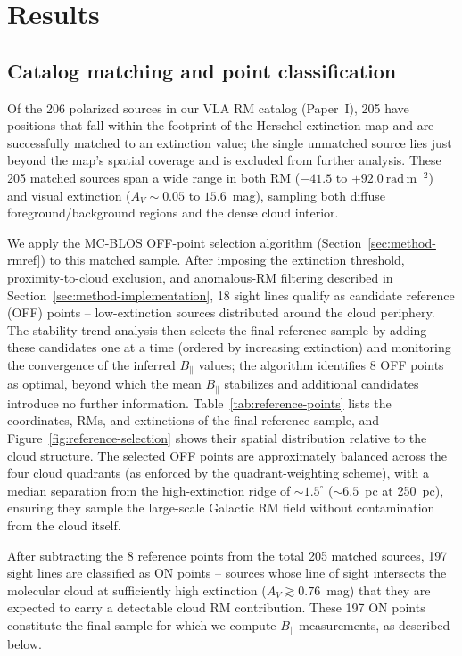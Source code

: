 \documentclass[twocolumn]{aastex631}
\begin{document}
\section{Results}
\label{sec:results}

\subsection{Catalog matching and point classification}

Of the 206 polarized sources in our VLA RM catalog (Paper~I), 205 have positions that fall within the footprint of the Herschel extinction map and are successfully matched to an extinction value; the single unmatched source lies just beyond the map's spatial coverage and is excluded from further analysis. These 205 matched sources span a wide range in both RM ($-41.5$ to $+92.0~\mathrm{rad\,m^{-2}}$) and visual extinction ($A_V \sim 0.05$ to $15.6$~mag), sampling both diffuse foreground/background regions and the dense cloud interior.

We apply the MC-BLOS OFF-point selection algorithm (Section~\ref{sec:method-rmref}) to this matched sample. After imposing the extinction threshold, proximity-to-cloud exclusion, and anomalous-RM filtering described in Section~\ref{sec:method-implementation}, 18 sight lines qualify as candidate reference (OFF) points -- low-extinction sources distributed around the cloud periphery. The stability-trend analysis then selects the final reference sample by adding these candidates one at a time (ordered by increasing extinction) and monitoring the convergence of the inferred $B_\parallel$ values; the algorithm identifies 8 OFF points as optimal, beyond which the mean $B_\parallel$ stabilizes and additional candidates introduce no further information. Table~\ref{tab:reference-points} lists the coordinates, RMs, and extinctions of the final reference sample, and Figure~\ref{fig:reference-selection} shows their spatial distribution relative to the cloud structure. The selected OFF points are approximately balanced across the four cloud quadrants (as enforced by the quadrant-weighting scheme), with a median separation from the high-extinction ridge of $\sim1.5^\circ$ ($\sim6.5$~pc at 250~pc), ensuring they sample the large-scale Galactic RM field without contamination from the cloud itself.

After subtracting the 8 reference points from the total 205 matched sources, 197 sight lines are classified as ON points -- sources whose line of sight intersects the molecular cloud at sufficiently high extinction ($A_V \gtrsim 0.76$~mag) that they are expected to carry a detectable cloud RM contribution. These 197 ON points constitute the final sample for which we compute $B_\parallel$ measurements, as described below.
\end{document}
